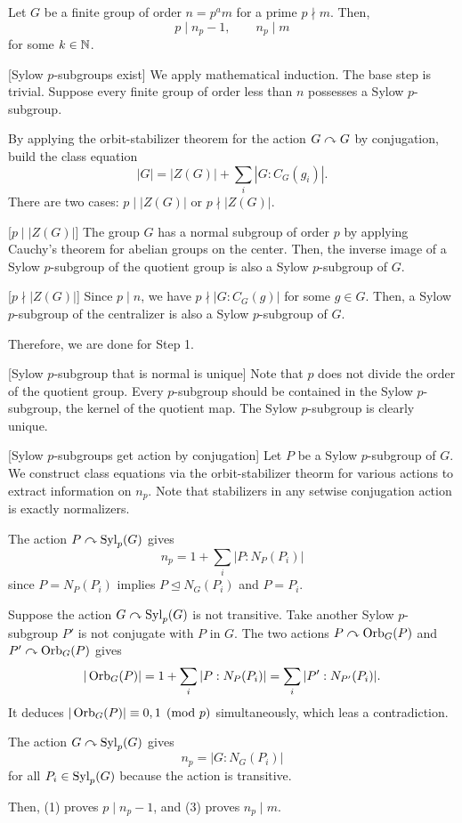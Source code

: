 \documentclass{../exp}
\begin{document}
\begin{thm}
Let $G$ be a finite group of order $n=p^am$ for a prime $p\nmid m$.
Then,
\[p\mid n_p-1,\qquad n_p\mid m\]
for some $k\in\mathbb{N}$.
\end{thm}
\begin{pf}
[Sylow $p$-subgroups exist]
We apply mathematical induction.
The base step is trivial.
Suppose every finite group of order less than $n$ possesses a Sylow $p$-subgroup.

By applying the orbit-stabilizer theorem for the action $G\curvearrowright G$ by conjugation, build the class equation
\[|G|=|Z(G)|+\sum_i|G:C_G(g_i)|.\]
There are two cases: $p\mid|Z(G)|$ or $p\nmid|Z(G)|$.

[$p\mid|Z(G)|$]
The group $G$ has a normal subgroup of order $p$ by applying Cauchy's theorem for abelian groups on the center.
Then, the inverse image of a Sylow $p$-subgroup of the quotient group is also a Sylow $p$-subgroup of $G$.

[$p\nmid|Z(G)|$]
Since $p\mid n$, we have $p\nmid|G:C_G(g)|$ for some $g\in G$.
Then, a Sylow $p$-subgroup of the centralizer is also a Sylow $p$-subgroup of $G$.

Therefore, we are done for Step 1.

\bigskip
{}[Sylow $p$-subgroup that is normal is unique]
Note that $p$ does not divide the order of the quotient group.
Every $p$-subgroup should be contained in the Sylow $p$-subgroup, the kernel of the quotient map.
The Sylow $p$-subgroup is clearly unique.

\bigskip
{}[Sylow $p$-subgroups get action by conjugation]
Let $P$ be a Sylow $p$-subgroup of $G$.
We construct class equations via the orbit-stabilizer theorm for various actions to extract information on $n_p$.
Note that stabilizers in any setwise conjugation action is exactly normalizers.
\begin{cond}
\item The action $P\curvearrowright\operatorname{Syl}_p(G)$ gives
\[n_p=1+\sum_i|P:N_P(P_i)|\]
since $P=N_P(P_i)$ implies $P\trianglelefteq N_G(P_i)$ and $P=P_i$.
\item Suppose the action $G\curvearrowright\operatorname{Syl}_p(G)$ is not transitive.
Take another Sylow $p$-subgroup $P'$ is not conjugate with $P$ in $G$.
The two actions $P\curvearrowright\operatorname{Orb}_G(P)$ and $P'\curvearrowright\operatorname{Orb}_G(P)$ gives
\[|\operatorname{Orb}_G(P)|=1+\sum_i|P:N_P(P_i)|=\sum_i|P':N_{P'}(P_i)|.\]
It deduces $|\operatorname{Orb}_G(P)|\equiv0,1\pmod{p}$ simultaneously, which leas a contradiction.
\item The action $G\curvearrowright\operatorname{Syl}_p(G)$ gives
\[n_p=|G:N_G(P_i)|\]
for all $P_i\in\operatorname{Syl}_p(G)$ because the action is transitive.
\end{cond}
Then, (1) proves $p\mid n_p-1$, and (3) proves $n_p\mid m$.
\end{pf}
\end{document}

